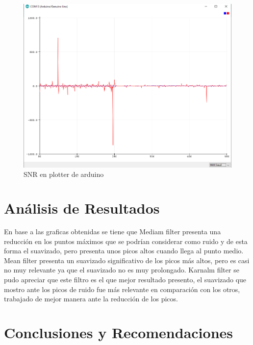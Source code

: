 \documentclass[10pt,a4paper]{article}
\begin{document}
\begin{figure}[H]
\centering
\includegraphics[scale=0.35]{snr3.png}
\caption{SNR en plotter de arduino}
\end{figure}
\section{Análisis de Resultados}
En base a las graficas obtenidas se tiene que Mediam filter presenta una reducción en los puntos máximos que se podrían considerar como ruido y de esta forma el suavizado, pero presenta unos picos altos cuando llega al punto medio. Mean filter presenta un suavizado significativo de los picos más altos, pero es casi no muy relevante ya que el suavizado no es muy prolongado. Karnalm filter se pudo apreciar que este filtro es el que mejor resultado presento, el suavizado que mostro ante los picos de ruido fue más relevante en comparación con los otros, trabajado de mejor manera ante la reducción de los picos.
\section{Conclusiones y Recomendaciones}
\end{document}
